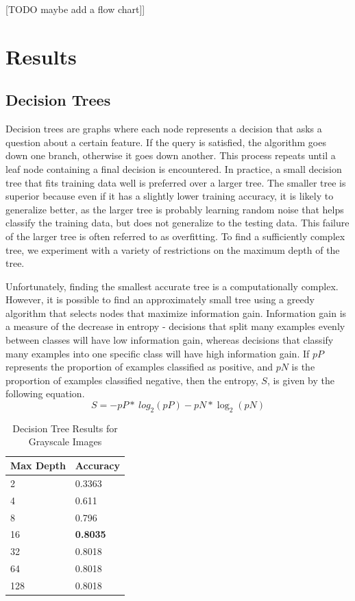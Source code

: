 \documentclass[12pt]{article}
\begin{document}
[TODO maybe add a flow chart]]

\section*{Results}
\subsection*{Decision Trees}
Decision trees are graphs where each node represents a decision that asks a question about a certain feature. If the query is satisfied, the algorithm goes down one branch, otherwise it goes down another. This process repeats until a leaf node containing a final decision is encountered. In practice, a small decision tree that fits training data well is preferred over a larger tree. The smaller tree is superior because even if it has a slightly lower training accuracy, it is likely to generalize better, as the larger tree is probably learning random noise that helps classify the training data, but does not generalize to the testing data. This failure of the larger tree is often referred to as overfitting. To find a sufficiently complex tree, we experiment with a variety of restrictions on the maximum depth of the tree.

Unfortunately, finding the smallest accurate tree is a computationally complex. However, it is possible to find an approximately small tree using a greedy algorithm that selects nodes that maximize information gain. Information gain is a measure of the decrease in entropy - decisions that split many examples evenly between classes will have low information gain, whereas decisions that classify many examples into one specific class will have high information gain. If $pP$ represents the proportion of examples classified as positive, and $pN$ is the proportion of examples classified negative, then the entropy, $S$, is given by the following equation.
\[
S = -pP *\ log_2(pP) -pN * \log_2(pN)
\]
\begin{table}[ht!]
\centering
\caption{Decision Tree Results for Grayscale Images}
    \begin{tabular}{|l|l|}
    \hline
    Max Depth & Accuracy \\ \hline
    2      & 0.3363   \\ \hline
    4      & 0.611   \\ \hline
    8      & 0.796   \\ \hline
    16      & \textbf{0.8035}   \\ \hline
    32      & 0.8018   \\ \hline
    64      & 0.8018   \\ \hline
    128      & 0.8018   \\ \hline
    \end{tabular}
\end{table}
\end{document}
